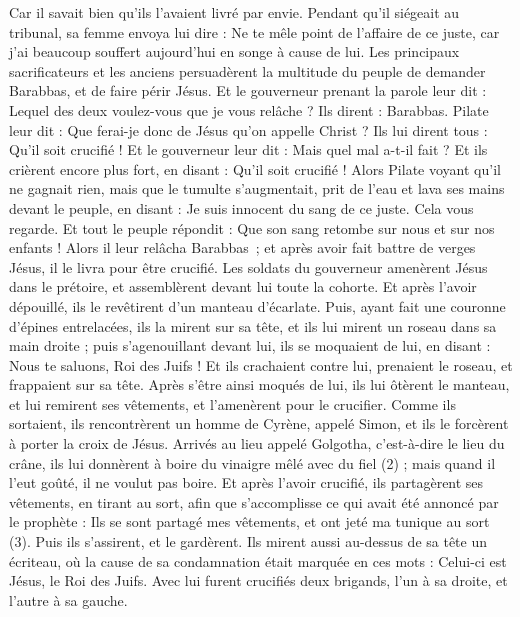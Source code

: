 \begin{multicols}{2}
{Car il savait bien qu'ils l'avaient livré par envie.
Pendant qu’il siégeait au tribunal, sa femme envoya lui dire : Ne te mêle point de l'affaire de ce juste, car j'ai beaucoup souffert aujourd'hui en songe à cause de lui.
Les principaux sacrificateurs et les anciens persuadèrent la multitude du peuple de demander Barabbas, et de faire périr Jésus.
Et le gouverneur prenant la parole leur dit : Lequel des deux voulez-vous que je vous relâche ? Ils dirent : Barabbas.
Pilate leur dit : Que ferai-je donc de Jésus qu'on appelle Christ ? Ils lui dirent tous : Qu’il soit crucifié !
Et le gouverneur leur dit : Mais quel mal a-t-il fait ? Et ils crièrent encore plus fort, en disant : Qu’il soit crucifié !
Alors Pilate voyant qu'il ne gagnait rien, mais que le tumulte s'augmentait, prit de l'eau et lava ses mains devant le peuple, en disant : Je suis innocent du sang de ce juste. Cela vous regarde.
Et tout le peuple répondit : Que son sang retombe sur nous et sur nos enfants !
Alors il leur relâcha Barabbas ; et après avoir fait battre de verges Jésus, il le livra pour être crucifié.
Les soldats du gouverneur amenèrent Jésus dans le prétoire, et assemblèrent devant lui toute la cohorte.
Et après l'avoir dépouillé, ils le revêtirent d’un manteau d'écarlate.
Puis, ayant fait une couronne d'épines entrelacées, ils la mirent sur sa tête, et ils lui mirent un roseau dans sa main droite ; puis s'agenouillant devant lui, ils se moquaient de lui, en disant : Nous te saluons, Roi des Juifs !
Et ils crachaient contre lui, prenaient le roseau, et frappaient sur sa tête.
\TextTitle{[Crucifixion]}
Après s'être ainsi moqués de lui, ils lui ôtèrent le manteau, et lui remirent ses vêtements, et l'amenèrent pour le crucifier.
Comme ils sortaient, ils rencontrèrent un homme de Cyrène, appelé Simon, et ils le forcèrent à porter la croix de Jésus.
Arrivés au lieu appelé Golgotha, c'est-à-dire le lieu du crâne,
ils lui donnèrent à boire du vinaigre mêlé avec du fiel (2) ; mais quand il l’eut goûté, il ne voulut pas boire.
Et après l'avoir crucifié, ils partagèrent ses vêtements, en tirant au sort, afin que s’accomplisse ce qui avait été annoncé par le prophète : Ils se sont partagé mes vêtements, et ont jeté ma tunique au sort (3).
Puis ils s’assirent, et le gardèrent.
Ils mirent aussi au-dessus de sa tête un écriteau, où la cause de sa condamnation était marquée en ces mots : Celui-ci est Jésus, le Roi des Juifs.
Avec lui furent crucifiés deux brigands, l'un à sa droite, et l'autre à sa gauche.
}
\end{multicols}
